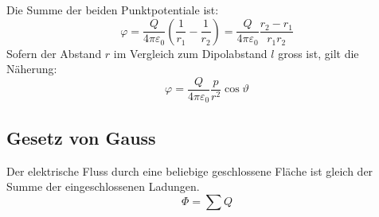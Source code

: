 Die Summe der beiden Punktpotentiale ist:
\[
	\varphi
		= \frac{Q}{4\pi\varepsilon_0} \left(\frac{1}{r_1} - \frac{1}{r_2}\right)
		= \frac{Q}{4\pi\varepsilon_0} \frac{r_2 - r_1}{r_1 r_2}
\]
Sofern der Abstand $r$ im Vergleich zum Dipolabstand $l$ gross ist, gilt die
Näherung:
\[
	\varphi = \frac{Q}{4\pi\varepsilon_0} \frac{p}{r^2} \cos \vartheta
\]

\subsection{Gesetz von Gauss}

Der elektrische Fluss durch eine beliebige geschlossene Fläche ist gleich der
Summe der eingeschlossenen Ladungen.
\[
	\Phi = \sum Q
\]
